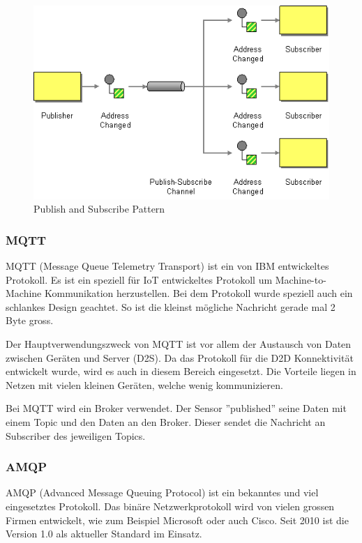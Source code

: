 \begin{figure}[H]
\centering
\includegraphics[scale=0.55]{../02_Analyse/images/publishsubscribe.png}
\caption{Publish and Subscribe Pattern\cite{PublishSubscribePattern}}
\end{figure}
\subsubsection{MQTT}
MQTT (Message Queue Telemetry Transport) ist ein von IBM entwickeltes Protokoll. Es ist ein speziell für IoT entwickeltes Protokoll um Machine-to-Machine Kommunikation herzustellen. Bei dem Protokoll wurde speziell auch ein schlankes Design geachtet. So ist die kleinst mögliche Nachricht gerade mal 2 Byte gross. 

Der Hauptverwendungszweck von MQTT ist vor allem der Austausch von Daten zwischen Geräten und Server (D2S).\cite{ProtPubSub} Da das Protokoll für die D2D Konnektivität entwickelt wurde, wird es auch in diesem Bereich eingesetzt. Die Vorteile liegen in Netzen mit vielen kleinen Geräten, welche wenig kommunizieren.\cite{ProtPubSubReason}

Bei MQTT wird ein Broker verwendet. Der Sensor ''published'' seine Daten mit einem Topic und den Daten an den Broker. Dieser sendet die Nachricht an Subscriber des jeweiligen Topics.
\subsubsection{AMQP}
AMQP (Advanced Message Queuing Protocol) ist ein bekanntes und viel eingesetztes Protokoll. Das binäre Netzwerkprotokoll wird von vielen grossen Firmen\cite{ProtPubSubReason} entwickelt, wie zum Beispiel Microsoft oder auch Cisco. Seit 2010 ist die Version 1.0 als aktueller Standard im Einsatz.

